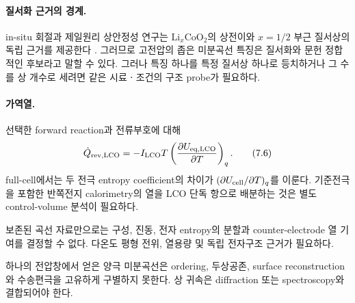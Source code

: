 \paragraph{ 질서화 근거의 경계.}
in-situ 회절과 제일원리 상안정성 연구는
$\mathrm{Li}_x\mathrm{CoO_2}$의 상전이와 $x=1/2$ 부근 질서상의
독립 근거를 제공한다 \cite{reimersLCO,vandervenLCO}. 그러므로
고전압의 좁은 미분곡선 특징은 질서화와 문헌 정합적인 후보라고
말할 수 있다. 그러나 특징 하나를 특정 질서상 하나로 등치하거나 그 수를
상 개수로 세려면 같은 시료ㆍ조건의 구조 probe가 필요하다.

\paragraph{ 가역열.}
선택한 forward reaction과 전류부호에 대해
\[
 \dot Q_{\mathrm{rev},\mathrm{LCO}}
 =-I_{\mathrm{LCO}}T
 \left(\frac{\partial U_{\mathrm{eq},\mathrm{LCO}}}{\partial T}\right)_q .
 \tag{7.6}
\]
full-cell에서는 두 전극 entropy coefficient의 차이가
$(\partial U_{\mathrm{cell}}/\partial T)_q$를 이룬다. 기준전극을 포함한
반쪽전지 calorimetry의 열을 LCO 단독 항으로 배분하는 것은 별도
control-volume 분석이 필요하다.

\begin{openitem}
보존된 곡선 자료만으로는 구성, 진동, 전자 entropy의 분할과
counter-electrode 열 기여를 결정할 수 없다. 다온도 평형 전위,
열용량 및 독립 전자구조 근거가 필요하다.
\end{openitem}

\begin{identifiability}
하나의 전압창에서 얻은 양극 미분곡선은 ordering, 두상공존,
surface reconstruction와 수송편극을 고유하게 구별하지 못한다.
상 귀속은 diffraction 또는 spectroscopy와 결합되어야 한다.
\end{identifiability}
